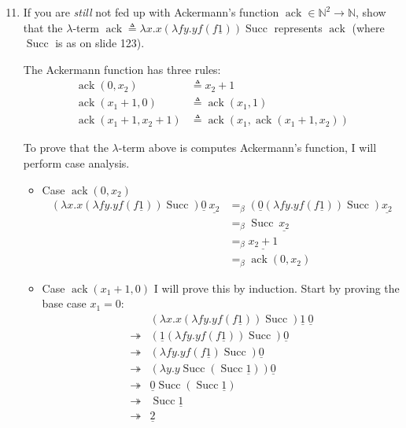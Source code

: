 \documentclass[10pt,\jkfside,a4paper]{article}
\begin{document}
\begin{enumerate}[label=\arabic*.]

\setcounter{enumii}{10}

\item If you are \textit{still} not fed up with Ackermann's function
$\mathop{ack} \in \mathbb{N}^2 \to \mathbb{N}$, show that the $\lambda$-term
$\mathop{ack} \triangleq \lambda x. x(\lambda f y. y f(f \underline{1}))
\mathop{Succ}$ represents $\mathop{ack}$ (where $\mathop{Succ}$ is as on slide 123).

The Ackermann function has three rules:
\begin{align*}
\mathop{ack}(0, x_2) &\triangleq x_2 + 1 \\
\mathop{ack}(x_1 + 1, 0) &\triangleq \mathop{ack}(x_1, 1) \\
\mathop{ack}(x_1 + 1, x_2 + 1) &\triangleq
\mathop{ack}(x_1, \mathop{ack}(x_1 + 1, x_2))
\end{align*}

To prove that the $\lambda$-term above is computes Ackermann's function, I
will perform case analysis.

\begin{itemize}

\item Case $\mathop{ack}(0, x_2)$
\begin{align*}
(\lambda x. x(\lambda f y. y f(f \underline{1}))
\mathop{Succ})\underline{0}\ \underline{x_2}
&=_{\beta}
(\underline{0}(\lambda f y. y f(f \underline{1}))
\mathop{Succ})\underline{x_2} \\
&=_{\beta}
\mathop{Succ}\  \underline{x_2} \\
&=_{\beta}
\underline{x_2 + 1} \\
&=_{\beta} \mathop{ack}(0, x_2)
\end{align*}

\item Case $\mathop{ack}(x_1 + 1, 0)$
I will prove this by induction. Start by proving the base case $x_1 = 0$:
\begin{align*}
& (\lambda x. x(\lambda f y. y f(f \underline{1}))
\mathop{Succ})\underline{1}\ \underline{0} \\
\twoheadrightarrow &
(\underline{1}(\lambda f y. y f(f \underline{1}))
\mathop{Succ})\underline{0} \\
\twoheadrightarrow &
(\lambda f y. y f(f \underline{1})
\mathop{Succ})\underline{0} \\
\twoheadrightarrow &
(\lambda y. y \mathop{Succ} (\mathop{Succ} \underline{1}))\underline{0} \\
\twoheadrightarrow &
\underline{0} \mathop{Succ} (\mathop{Succ} \underline{1}) \\
\twoheadrightarrow &
\mathop{Succ} \underline{1} \\
\twoheadrightarrow &
\underline{2} \\
\end{align*}


\end{itemize}
\end{enumerate}
\end{document}
